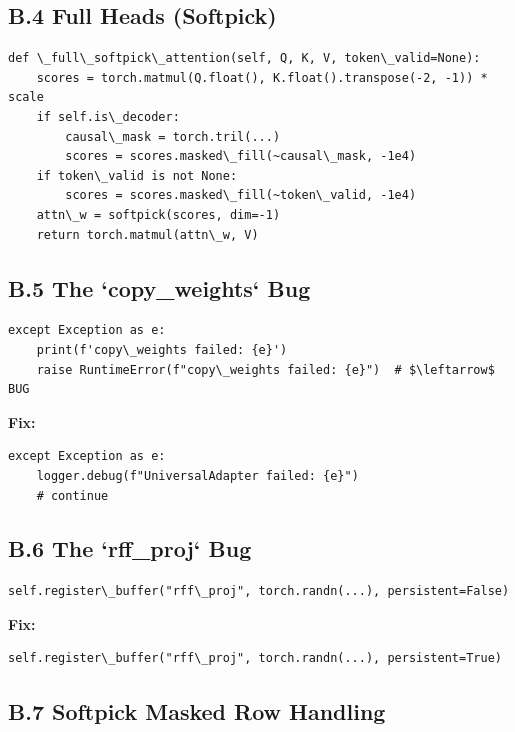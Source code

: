 \subsection{B.4 Full Heads (Softpick)}

\begin{lstlisting}
def \_full\_softpick\_attention(self, Q, K, V, token\_valid=None):
    scores = torch.matmul(Q.float(), K.float().transpose(-2, -1)) * scale
    if self.is\_decoder:
        causal\_mask = torch.tril(...)
        scores = scores.masked\_fill(~causal\_mask, -1e4)
    if token\_valid is not None:
        scores = scores.masked\_fill(~token\_valid, -1e4)
    attn\_w = softpick(scores, dim=-1)
    return torch.matmul(attn\_w, V)
\end{lstlisting}

\subsection{B.5 The `copy\_weights` Bug}

\begin{lstlisting}
except Exception as e:
    print(f'copy\_weights failed: {e}')
    raise RuntimeError(f"copy\_weights failed: {e}")  # $\leftarrow$ BUG
\end{lstlisting}

\textbf{Fix:}

\begin{lstlisting}
except Exception as e:
    logger.debug(f"UniversalAdapter failed: {e}")
    # continue
\end{lstlisting}

\subsection{B.6 The `rff\_proj` Bug}

\begin{lstlisting}
self.register\_buffer("rff\_proj", torch.randn(...), persistent=False)
\end{lstlisting}

\textbf{Fix:}

\begin{lstlisting}
self.register\_buffer("rff\_proj", torch.randn(...), persistent=True)
\end{lstlisting}

\subsection{B.7 Softpick Masked Row Handling}

